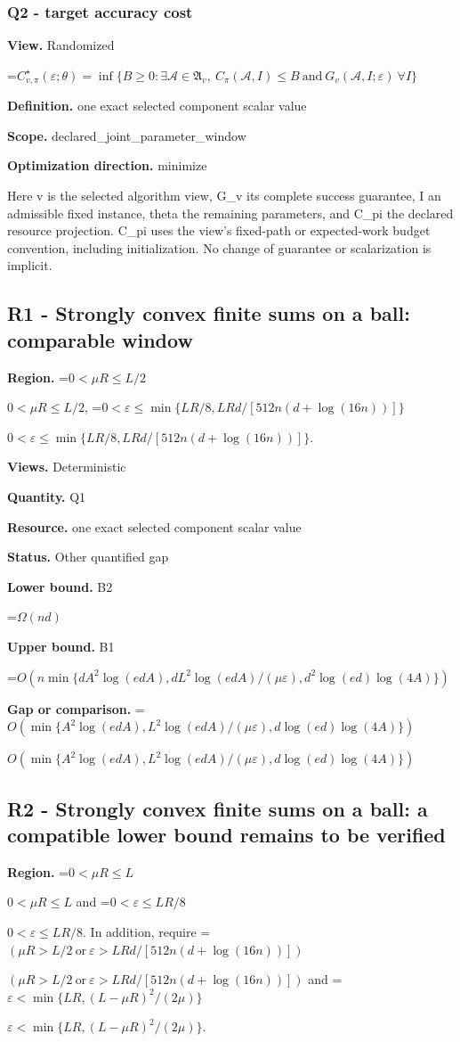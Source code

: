 \documentclass[10pt,a4paper]{article}
\newcommand{\AtlasMath}[1]{\par\begingroup\centering\setbox0=\hbox{$\displaystyle #1$}\ifdim\wd0>1.4\linewidth\typeout{ATLAS WIDE FORMULA: \the\wd0}\fi\ifdim\wd0>\linewidth\resizebox{\linewidth}{!}{\box0}\else\box0\fi\par\endgroup}
\newcommand{\AtlasInlineMath}[1]{\begingroup\setbox0=\hbox{$#1$}\ifdim\wd0>.4\linewidth\endgroup\AtlasMath{#1}\else\endgroup$#1$\fi}
\begin{document}
\subsubsection{Q2 - target accuracy cost}
\textbf{View.} Randomized

\AtlasMath{C^\star_{v,\pi}(\varepsilon;\theta)=\inf\{B\ge0:\exists\mathcal A\in\mathfrak A_v,\ C_\pi(\mathcal A,I)\le B\ \text{and}\ G_v(\mathcal A,I;\varepsilon)\ \forall I\}}
\textbf{Definition.} one exact selected component scalar value

\textbf{Scope.} declared\_joint\_parameter\_window

\textbf{Optimization direction.} minimize

Here v is the selected algorithm view, G\_v its complete success guarantee, I an admissible fixed instance, theta the remaining parameters, and C\_pi the declared resource projection. C\_pi uses the view's fixed-path or expected-work budget convention, including initialization. No change of guarantee or scalarization is implicit.

\subsection{R1 - Strongly convex finite sums on a ball: comparable window}
\textbf{Region.} \AtlasInlineMath{0<\mu R\le L/2}, \AtlasInlineMath{0<\varepsilon\le\min\{LR/8,LRd/[512n(d+\log(16n))]\}}.

\textbf{Views.} Deterministic

\textbf{Quantity.} Q1

\textbf{Resource.} one exact selected component scalar value

\textbf{Status.} Other quantified gap

\textbf{Lower bound.} B2

\AtlasMath{\Omega(nd)}
\textbf{Upper bound.} B1

\AtlasMath{O\!\left(n\min\{dA^2\log(edA),dL^2\log(edA)/(\mu\varepsilon),d^2\log(ed)\log(4A)\}\right)}
\textbf{Gap or comparison.} \AtlasInlineMath{O(\min\{A^2\log(edA),L^2\log(edA)/(\mu\varepsilon),d\log(ed)\log(4A)\})}

\subsection{R2 - Strongly convex finite sums on a ball: a compatible lower bound remains to be verified}
\textbf{Region.} \AtlasInlineMath{0<\mu R\le L} and \AtlasInlineMath{0<\varepsilon\le LR/8}. In addition, require \AtlasInlineMath{(\mu R>L/2\ \text{or}\ \varepsilon>LRd/[512n(d+\log(16n))])} and \AtlasInlineMath{\varepsilon<\min\{LR,(L-\mu R)^2/(2\mu)\}}.
\end{document}
